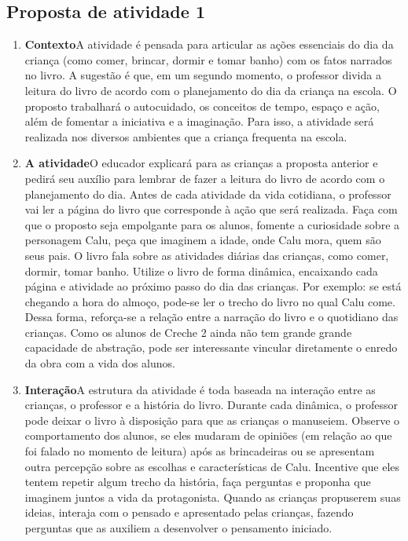 \documentclass[11pt]{extarticle}
\begin{document}
\subsection{Proposta de atividade 1}



\begin{enumerate}
\item \textbf{Contexto}\quad A atividade é pensada para articular as ações essenciais do dia da criança (como comer, brincar, dormir e tomar banho) com os fatos narrados no livro. A sugestão é que, em um segundo momento, o professor divida a leitura do livro de acordo com o planejamento do dia da criança na escola. O proposto trabalhará o autocuidado, os conceitos de tempo, espaço e ação, além de fomentar a iniciativa e a imaginação. 
Para isso, a atividade será realizada nos diversos ambientes que a criança frequenta na escola. 

\item \textbf{A atividade}\quad O educador explicará para as crianças a proposta anterior e pedirá seu auxílio para lembrar de fazer a leitura do livro de acordo com o planejamento do dia. Antes de cada atividade da vida cotidiana, o professor vai ler a página do livro que corresponde à ação que será realizada. Faça com que o proposto seja empolgante para os alunos, fomente a curiosidade sobre a personagem Calu, peça que imaginem a idade, onde Calu mora, quem são seus pais. 
O livro fala sobre as atividades diárias das crianças, como comer, dormir, tomar banho. Utilize o livro de forma dinâmica, encaixando cada página e atividade ao próximo passo do dia das crianças. Por exemplo: se está chegando a hora do almoço, pode-se ler o trecho do livro no qual Calu come.
Dessa forma, reforça-se a relação entre a narração do livro e o quotidiano das crianças. Como os alunos de Creche 2 ainda não tem grande grande capacidade de abstração, pode ser interessante vincular diretamente o enredo da obra com a vida dos alunos.

\item \textbf{Interação}\quad A estrutura da atividade é toda baseada na interação entre as crianças, o professor e a história do livro. Durante cada dinâmica, o professor pode deixar o livro à disposição para que as crianças o manuseiem. Observe o comportamento dos alunos, se eles mudaram de opiniões (em relação ao que foi falado no momento de leitura) após as brincadeiras ou se apresentam outra percepção sobre as escolhas e características de Calu. Incentive que eles tentem repetir algum trecho da história,
faça perguntas e proponha que imaginem juntos a vida da protagonista. Quando as crianças propuserem suas ideias, interaja com o pensado e apresentado pelas crianças, fazendo perguntas que as auxiliem a desenvolver o pensamento iniciado.


\end{enumerate}
\end{document}

